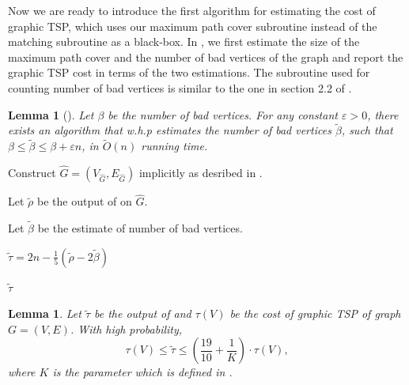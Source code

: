 \documentclass[letterpaper,11pt]{article}
\renewcommand{\epsilon}{\varepsilon}
\newcommand{\tspsize}[1]{\ensuremath{\tau}(#1)}
\newcommand{\algtwo}[0]{\Cref{alg:path-cover22}}
\newtheorem{lemma}[theorem]{Lemma}
\begin{document}
Now we are ready to introduce the first algorithm for estimating the cost of graphic TSP, which uses our maximum path cover subroutine instead of the matching subroutine as a black-box. In , we first estimate the size of the maximum path cover and the number of bad vertices of the graph and report the graphic TSP cost in terms of the two estimations. The subroutine used for counting number of bad vertices is similar to the one in section 2.2 of \cite{chen2020}.

\begin{lemma}[\cite{chen2020}]\label{lem: bad-vertices-estimator}
Let $\beta$ be the number of bad vertices. For any constant $\epsilon > 0$, there exists an algorithm that w.h.p estimates the number of bad vertices $\tilde{\beta}$, such that $\beta \leq \tilde{\beta} \leq \beta + \epsilon n $, in $\tilde{O}(n)$ running time.
\end{lemma}

\begin{algorithm}
\caption{First algorithm for graphic TSP.}
\label{alg: graphic-tsp}
    Construct $\hat{G} = (V_{\hat{G}}, E_{\hat{G}})$ implicitly as desribed in .
    
    Let $\tilde{\rho}$ be the output of  on $\hat{G}$.
    
    Let $\tilde{\beta}$ be the estimate of number of bad vertices.
    
    $\tilde{\tau} = 2n - \frac{1}{5}(\tilde{\rho} - 2\tilde{\beta})$
    
    \Return $\tilde{\tau}$
\end{algorithm}

\begin{lemma}\label{lem: graphic-tsp-approx1}
Let $\tilde{\tau}$ be the output of  and $\tspsize{V}$ be the cost of graphic TSP of graph $G = (V, E)$. With high probability,
$$
\tspsize{V} \leq \tilde{\tau} \leq (\frac{19}{10} + \frac{1}{K})\cdot \tspsize{V},
$$
where $K$ is the parameter which is defined in \algtwo{}.
\end{lemma}
\end{document}
